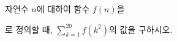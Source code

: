 \hspace*{2mm}\begin{minipage}[t]{\dimexpr\linewidth-2mm\relax}\vspace{0pt}
자연수 $n$에 대하여 함수 $f(n)$을 \par\smallskip{}\par\smallskip\noindent 로 정의할 때, $\displaystyle\sum_{k=1}^{20}f(k^2)$의 값을 구하시오.\end{minipage}

